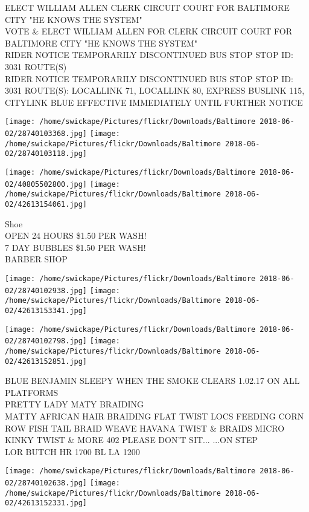 \documentclass[10pt,letterpaper]{article}
\begin{document}
ELECT WILLIAM ALLEN CLERK CIRCUIT COURT FOR BALTIMORE CITY "HE KNOWS THE SYSTEM"\\
VOTE \& ELECT WILLIAM ALLEN FOR CLERK CIRCUIT COURT FOR BALTIMORE CITY "HE KNOWS THE SYSTEM"\\
RIDER NOTICE TEMPORARILY DISCONTINUED BUS STOP STOP ID: 3031 ROUTE(S)\\
RIDER NOTICE TEMPORARILY DISCONTINUED BUS STOP STOP ID: 3031 ROUTE(S): LOCALLINK 71, LOCALLINK 80, EXPRESS BUSLINK 115, CITYLINK BLUE EFFECTIVE IMMEDIATELY UNTIL FURTHER NOTICE
\pagebreak

\texttt{[image: /home/swickape/Pictures/flickr/Downloads/Baltimore 2018-06-02/28740103368.jpg]}
\texttt{[image: /home/swickape/Pictures/flickr/Downloads/Baltimore 2018-06-02/28740103118.jpg]}

\texttt{[image: /home/swickape/Pictures/flickr/Downloads/Baltimore 2018-06-02/40805502800.jpg]}
\texttt{[image: /home/swickape/Pictures/flickr/Downloads/Baltimore 2018-06-02/42613154061.jpg]}

Shoe\\
OPEN 24 HOURS \$1.50 PER WASH!\\
7 DAY BUBBLES \$1.50 PER WASH!\\
BARBER SHOP
\pagebreak

\texttt{[image: /home/swickape/Pictures/flickr/Downloads/Baltimore 2018-06-02/28740102938.jpg]}
\texttt{[image: /home/swickape/Pictures/flickr/Downloads/Baltimore 2018-06-02/42613153341.jpg]}

\texttt{[image: /home/swickape/Pictures/flickr/Downloads/Baltimore 2018-06-02/28740102798.jpg]}
\texttt{[image: /home/swickape/Pictures/flickr/Downloads/Baltimore 2018-06-02/42613152851.jpg]}

BLUE BENJAMIN SLEEPY WHEN THE SMOKE CLEARS 1.02.17 ON ALL PLATFORMS\\
PRETTY LADY MATY BRAIDING\\
MATTY AFRICAN HAIR BRAIDING FLAT TWIST LOCS FEEDING CORN ROW FISH TAIL BRAID WEAVE HAVANA TWIST \& BRAIDS MICRO KINKY TWIST \& MORE 402 PLEASE DON'T SIT... ...ON STEP\\
LOR BUTCH HR 1700 BL LA 1200
\pagebreak

\texttt{[image: /home/swickape/Pictures/flickr/Downloads/Baltimore 2018-06-02/28740102638.jpg]}
\texttt{[image: /home/swickape/Pictures/flickr/Downloads/Baltimore 2018-06-02/42613152331.jpg]}
\end{document}
